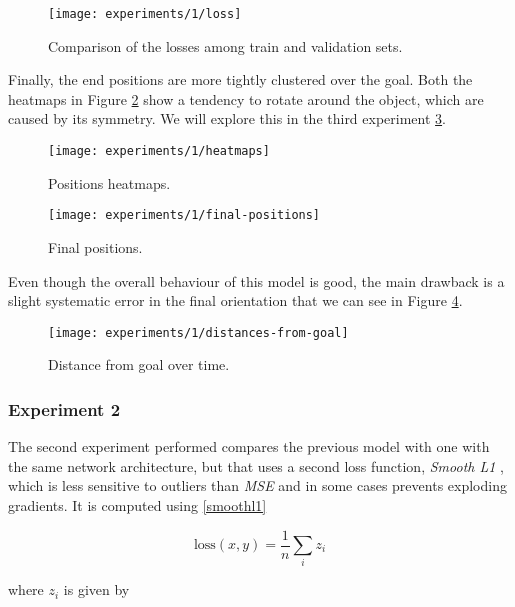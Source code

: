 \begin{figure}[htbp]
	
\centerline{\texttt{[image: experiments/1/loss]}}
	\caption{Comparison of the losses among train and validation sets.}
	\label{fig:loss}
\end{figure}

Finally, the end positions are more tightly clustered over the goal.
Both the heatmaps in Figure \ref{fig:heatmaps} show a tendency to rotate around 
the object, which are caused by its symmetry. We will explore this in the third 
experiment \ref{fig:final-positions}.

\begin{figure}[htbp]
	\centerline{\texttt{[image: experiments/1/heatmaps]}}
	\caption{Positions heatmaps.}
	\label{fig:heatmaps}
\end{figure}

\begin{figure}[htbp]
	\centerline{\texttt{[image: experiments/1/final-positions]}}
	\caption{Final positions.}
	\label{fig:final-positions}
\end{figure}

Even though the overall behaviour of this model is good, the main drawback is a 
slight systematic error in the final orientation that we can see in Figure 
\ref{fig:distance-from-goal-learned}.

\begin{figure}[htbp]
	\centerline{\texttt{[image: experiments/1/distances-from-goal]}}
	\caption{Distance from goal over time.}
	\label{fig:distance-from-goal-learned}
\end{figure}

\subsubsection{Experiment 2}
The second experiment performed compares the previous model with one with the 
same network architecture, but that uses a second loss function, \emph{Smooth 
L1} \cite{smoothl1}, which is less sensitive to outliers than \emph{MSE} and in 
some cases prevents exploding gradients. It is computed using \eqref{smoothl1}

\begin{equation}
\text{loss}(x, y) = \frac{1}{n}\sum_{i}z_i
\label{smoothl1}
\end{equation}

where $z_i$ is given by

